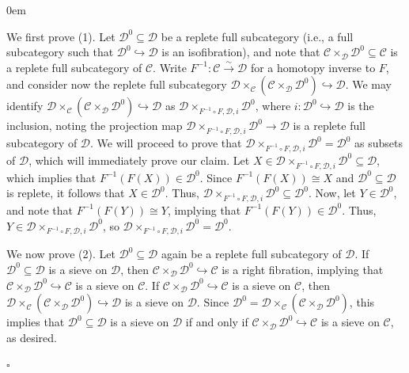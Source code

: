 \documentclass[10pt]{article}
\newcommand{\C}{\mathcal C}
\newcommand{\cD}{\mathcal{D}}
\renewcommand{\qed}{\hfill$\square$}
\renewenvironment{proof}{\begin{addmargin}[1em]{0em}\begin{newproof}}{\end{newproof}\end{addmargin}\qed}
\theoremstyle{witharg}
\theoremstyle{witharg}
\theoremstyle{witharg2}
\begin{document}
\begin{proof}

    We first prove (1). Let $\cD^0\subseteq \cD$ be a replete full subcategory (i.e., a full subcategory such that $\cD^0\hookrightarrow \cD$ is an isofibration), and note that $\C\times_\cD\cD^0\subseteq \C$ is a replete full subcategory of $\C$. Write $F^{-1}:\C\xrightarrow{\sim}\cD$ for a homotopy inverse to $F$, and consider now the replete full subcategory $\cD\times_\C(\C\times_\cD\cD^0)\hookrightarrow \cD$. We may identify $\cD\times_\C(\C\times_\cD\cD^0)\hookrightarrow \cD$ as $\cD\times_{F^{-1}\circ F,\cD,i}\cD^0$, where $i:\cD^0\hookrightarrow \cD$ is the inclusion, noting the projection map $\cD\times_{F^{-1}\circ F,\cD,i}\cD^0\rightarrow \cD$ is a replete full subcategory of $\cD$. We will proceed to prove that $\cD\times_{F^{-1}\circ F,\cD,i}\cD^0=\cD^0$ as subsets of $\cD$, which will immediately prove our claim. Let $X\in \cD\times_{F^{-1}\circ F,\cD,i}\cD^0\subseteq \cD$, which implies that $F^{-1}(F(X))\in \cD^0$. Since $F^{-1}(F(X))\cong X$ and $\cD^0\subseteq \cD$ is replete, it follows that $X\in \cD^0$. Thus, $\cD\times_{F^{-1}\circ F,\cD,i}\cD^0\subseteq \cD^0$. Now, let $Y\in \cD^0$, and note that $F^{-1}(F(Y))\cong Y$, implying that $F^{-1}(F(Y))\in \cD^0$. Thus, $Y\in \cD\times_{F^{-1}\circ F,\cD,i}\cD^0$, so $\cD\times_{F^{-1}\circ F,\cD,i}\cD^0=\cD^0$. 


    We now prove (2). Let $\cD^0\subseteq \cD$ again be a replete full subcategory of $\cD$. If $\cD^0\subseteq \cD$ is a sieve on $\cD$, then $\C\times_\cD\cD^0\hookrightarrow \C$ is a right fibration, implying that $\C\times_\cD\cD^0\hookrightarrow \C$ is a sieve on $\C$. If $\C\times_\cD\cD^0\hookrightarrow \C$ is a sieve on $\C$, then $\cD\times_\C(\C\times_\cD\cD^0)\hookrightarrow \cD$ is a sieve on $\cD$. Since $\cD^0=\cD\times_\C(\C\times_\cD\cD^0)$, this implies that $\cD^0\subseteq \cD$ is a sieve on $\cD$ if and only if $\C\times_\cD\cD^0\hookrightarrow \C$ is a sieve on $\C$, as desired. 


\end{proof}
\end{document}
